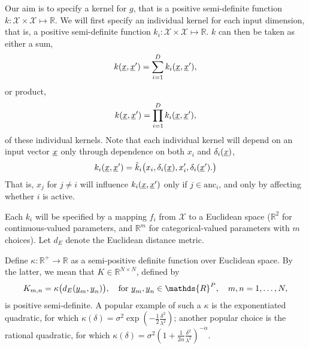\documentclass[letterpaper]{article}
\newcommand{\vect}[1]{\underline{\smash{#1}}}
\renewcommand{\v}[1]{\vect{#1}}
\newcommand{\reals}{\mathds{R}}
\newcommand{\sX}{\mathcal{X}}
\begin{document}
Our aim is to specify a kernel for $g$, that is a positive semi-definite function  $k\colon \sX \times \sX \mapsto \reals$. We will first specify an individual kernel for each input dimension, that is, a positive semi-definite function $k_i\colon \sX \times \sX \mapsto \reals$. $k$ can then be taken as either a sum,
\begin{equation}
 k(\v{x}, \v{x}') = \sum_{i=1}^D k_i(\v{x},\v{x}'),
\end{equation}
or product,
\begin{equation}
 k(\v{x}, \v{x}') = \prod_{i=1}^D k_i(\v{x},\v{x}'),
\end{equation}
of these individual kernels. Note that each individual kernel will depend on an  input vector $\v{x}$ only through dependence on both $x_i$ and $\delta_i(\v{x})$,
\begin{equation}
  k_i(\v{x},\v{x}') = \tilde{k}_i\bigl(x_i,\delta_i(\v{x}),x_i', \delta_i(\v{x}'). \bigr)
\end{equation}
That is, $x_j$ for $j\neq i$ will influence $k_i(\v{x},\v{x}')$ only if $j \in \text{anc}_i$, and only by affecting whether $i$ is active.



Each $k_i$ will be specified by a mapping $f_i$ from
$\sX$ 
to a Euclidean space ($\reals^2$ for continuous-valued parameters, and $\reals^m$ for categorical-valued parameters with $m$ choices). Let $d{_E}$ denote the Euclidean distance metric. 

Define $\kappa\colon \reals^+ \to \reals$ as a semi-positive definite function over Euclidean space. By the latter, we mean that $K \in \reals^{N\times N}$, defined by 
\begin{equation}
 K_{m, n} = \kappa\bigl(d_E(\v{y}_m, \v{y}_n)\bigr),\quad \text{for }
\v{y}_m, \v{y}_n \in \reals^P,\quad m, n = 1, \ldots, N, 
\end{equation}
is positive semi-definite. A popular example of such a $\kappa$ is the exponentiated quadratic, for which $\kappa(\delta) = \sigma^2 \exp(-\frac{1}{2} \frac{\delta^2}{\lambda^2})$; another popular choice is the rational quadratic, for which $\kappa(\delta) = \sigma^2 (1+\frac{1}{2\alpha} \frac{\delta^2}{\lambda^2})^{-\alpha}$.
\end{document}
